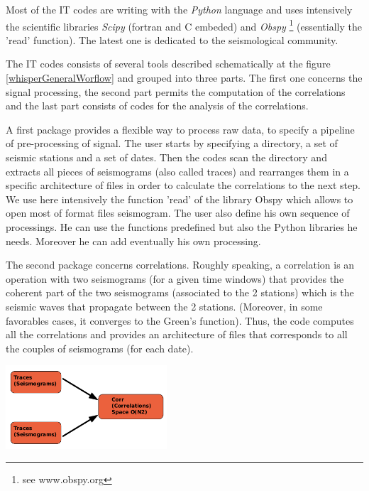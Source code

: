 \documentclass[a4paper, 10pt]{article}
\begin{document}
\begin{multicols}{2}
Most of the IT codes are writing with the \emph{Python} language and uses intensively the scientific libraries \emph{Scipy} (fortran and C embeded) 
and \emph{Obspy} \footnote{ see www.obspy.org} (essentially the 'read' function). The latest one is dedicated to the seismological community. 

The IT codes consists of several tools described schematically at the figure \ref{whisperGeneralWorflow} and grouped into three parts. The first one concerns the signal processing, the second part permits the computation of the correlations and the last part consists of codes for the analysis of the correlations.

A first package provides a flexible way to process raw data, to specify a pipeline of pre-processing of signal.
The user starts by specifying a directory, a set of seismic stations and a set of dates. Then the codes scan the directory
and extracts all pieces of seismograms (also called traces) and rearranges them in a specific architecture of files in order to calculate the correlations to the next step.
We use here intensively the function 'read' of the library Obspy which allows to open most of format files seismogram.
The user also define his own sequence of processings. He can use the functions predefined but also the Python libraries he needs. 
Moreover he can add eventually his own processing.

The second package concerns correlations. 
Roughly speaking, a correlation is an operation with two seismograms (for a given time windows) that provides the coherent part of the two seismograms 
(associated to the 2 stations) which is the seismic waves that propagate between the 2 stations.
(Moreover, in some favorables cases, it converges to the Green's function). 
Thus, the code computes all the correlations and provides an architecture of files that corresponds to all the couples of seismograms (for each date). 

\begin{center}%
\centering
{}
\includegraphics[width=6cm]{schemaCorrelationStep.png}
\end{center}


\end{multicols}
\end{document}
